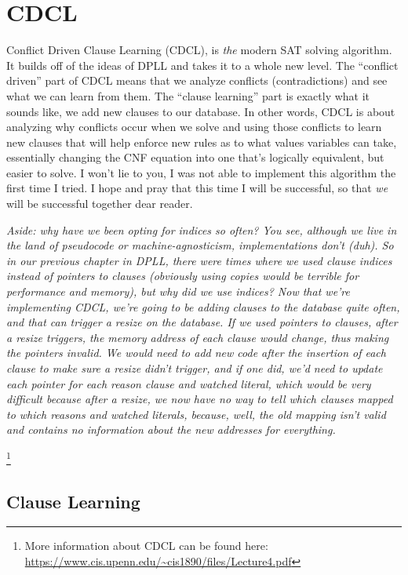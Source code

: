 \chapter{CDCL}

Conflict Driven Clause Learning (CDCL), is \textit{the} modern SAT solving 
algorithm. It builds off of the ideas of DPLL and takes it to a whole new level.
The ``conflict driven'' part of CDCL means that we analyze conflicts (contradictions)
and see what we can learn from them. The ``clause learning'' part is exactly what it 
sounds like, we add new clauses to our database. In other words, CDCL is about 
analyzing why conflicts occur when we solve and using those conflicts to learn 
new clauses that will help enforce new rules as to what values variables can take,
essentially changing the CNF equation into one that's logically equivalent, but 
easier to solve. I won't lie to you, I was not able to implement this algorithm the 
first time I tried. I hope and pray that this time I will be successful, so that 
\textit{we} will be successful together dear reader. 

\textit{Aside: why have we been opting for indices so often? You see, although
we live in the land of pseudocode or machine-agnosticism, implementations don't
(duh). So in our previous chapter in DPLL, there were times where we used clause 
indices instead of pointers to clauses (obviously using copies would be terrible 
for performance and memory), but why did we use indices? Now that we're implementing 
CDCL, we're going to be adding clauses to the database quite often, and that can 
trigger a resize on the database. If we used pointers to clauses, after a resize 
triggers, the memory address of each clause would change, thus making the pointers 
invalid. We would need to add new code after the insertion of each clause to make 
sure a resize didn't trigger, and if one did, we'd need to update each pointer for 
each reason clause and watched literal, which would be very difficult because after 
a resize, we now have no way to tell which clauses mapped to which reasons and watched 
literals, because, well, the old mapping isn't valid and contains no information about 
the new addresses for everything.
}

\footnote{More information about CDCL can be found here: 
    \url{https://www.cis.upenn.edu/~cis1890/files/Lecture4.pdf}}
\section{Clause Learning}

